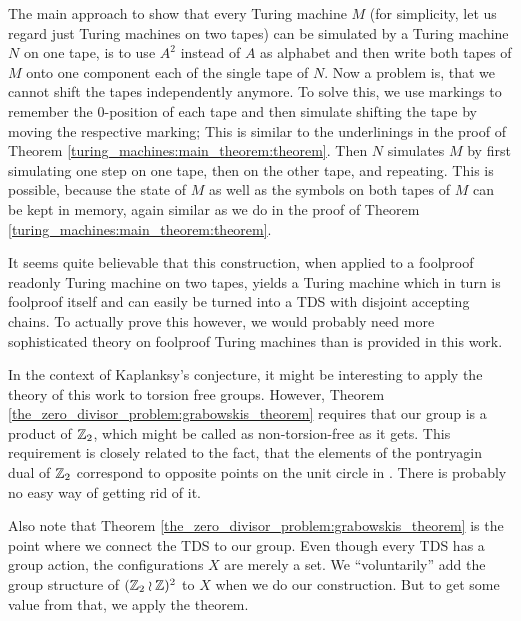 \begin{Remark}
	The main approach to show that every Turing machine $M$ (for simplicity, let us regard just Turing machines on two tapes) can be simulated by a Turing machine $N$ on one tape, is to use $A^2$ instead of $A$ as alphabet and then write both tapes of $M$ onto one component each of the single tape of $N$.
	Now a problem is, that we cannot shift the tapes independently anymore.
	To solve this, we use markings to remember the $0$-position of each tape and then simulate shifting the tape by moving the respective marking; This is similar to the underlinings in the proof of Theorem \ref{turing_machines:main_theorem:theorem}.
	Then $N$ simulates $M$ by first simulating one step on one tape, then on the other tape, and repeating.
	This is possible, because the state of $M$ as well as the symbols on both tapes of $M$ can be kept in memory, again similar as we do in the proof of Theorem \ref{turing_machines:main_theorem:theorem}.

	It seems quite believable that this construction, when applied to a foolproof readonly Turing machine on two tapes, yields a Turing machine which in turn is foolproof itself and can easily be turned into a TDS with disjoint accepting chains.
	To actually prove this however, we would probably need more sophisticated theory on foolproof Turing machines than is provided in this work.
\end{Remark}

\begin{Remark}
	\label{remarks:torsion_free_groups}
	In the context of Kaplanksy's conjecture, it might be interesting to apply the theory of this work to torsion free groups.
	However, Theorem \ref{the_zero_divisor_problem:grabowskis_theorem} requires that our group is a product of $\mathbb{Z}_2$, which might be called as non-torsion-free as it gets.
	This requirement is closely related to the fact, that the elements of the pontryagin dual of $\mathbb{Z}_2$ correspond to opposite points on the unit circle in \C.
	There is probably no easy way of getting rid of it.

	Also note that Theorem \ref{the_zero_divisor_problem:grabowskis_theorem} is the point where we connect the TDS to our group.
	Even though every TDS has a group action, the configurations $X$ are merely a set.
	We ``voluntarily'' add the group structure of $(\mathbb{Z}_2 \wr \mathbb{Z})^2$ to $X$ when we do our construction.
	But to get some value from that, we apply the theorem.
\end{Remark}

